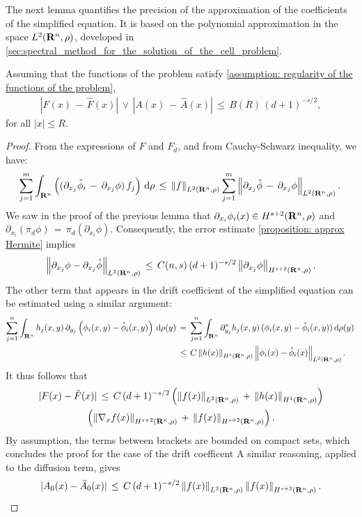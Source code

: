 The next lemma quantifies the precision of the approximation of the coefficients of the simplified equation. It is based on the polynomial approximation in the space $L^{2}(\mathbf R^n,\rho)$, developed in \cref{sec:spectral_method_for_the_solution_of_the_cell_problem}. 
\begin{lemma}
Assuming that the functions of the problem satisfy \cref{assumption: regularity
    of the functions of the problem}, 
\begin{gather*}
    |F(x) \,-\, \hat F(x)| \, \vee \, |A(x) \,-\, \hat A(x)| \, \leq \,  B(R) \,(d+1)^{-s/2},
\end{gather*}
for all $|x| \leq R$.
\label{lemma: Approximation coefficients}
\begin{proof}
    From the expressions of $F$ and $F_d$, and from Cauchy-Schwarz inequality, we have:
    $$ \sum^{m}_{j=1} \int_{\mathbf R^n}  \left((\partial_{x_j}\hat \phi_i \,-\, \partial_{x_j}\phi)\, f_j\right) \,\mathrm d \rho \,\leq\, \left\| f \right\|_{L^{2}(\mathbf R^n, \rho) }\sum^{m}_{j=1}  \left\| \partial_{x_j}\hat \phi \,-\, \partial_{x_j}\phi \right\|_{L^{2}(\mathbf R^n, \rho)}. \, $$
    We saw in the proof of the previous lemma that $\partial_{x_i} \phi_i(x)
    \in H^{s+2}(\mathbf R^n, \rho)$ and $\partial_{x_i} (\pi_d \phi) \,=\,
    \pi_d (\partial_{x_i}\phi)$. Consequently, the error estimate
    \cref{proposition: approx Hermite} implies
    $$
        \left\| \partial_{x_j}\phi- \partial_{x_j}\hat \phi \right\|_{L^{2}(\mathbf R^n,\rho) } \,\leq\, C(n,s) \, (d+1)^{-s/2} \left\| \partial_{x_j}\phi \right\|_{H^{s+2}(\mathbf R^n, \rho)}.
    $$
    The other term that appears in the drift coefficient of the simplified
    equation can be estimated using a similar argument:
    \begin{align*}
        \sum^{n}_{j=1} \int_{\mathbf R^n} h_j(x,y) \, \partial_{y_j} \left(\phi_i(x,y)-\hat\phi_i(x,y)\right) \,\mathrm d \rho(y) \,&=\,\sum^{n}_{j=1} \int_{\mathbf R^n} \partial^*_{y_j} h_j(x,y) \, (\phi_i(x,y)-\hat \phi_i(x,y)) \,\mathrm d \rho(y) \,\\ &\leq\,C \left\| h(x) \right\|_{H^{1}(\mathbf R^n, \rho)} \left\| \phi_i(x) - \hat \phi_i(x) \right\|_{L^{2}(\mathbf R^n, \rho)}.
    \end{align*}
    It thus follows that
    \begin{multline*}
        |F(x) - \hat F(x)| \,\leq\, C \,(d+1)^{-s/2}\left(\left\| f(x) \right\|_{L^{2}(\mathbf R^n,\rho)} \,+\, \left\| h(x) \right\|_{H^{1}(\mathbf R^n, \rho)} \right) \\ \left(\left\| \nabla_x f(x) \right\|_{H^{s+2}(\mathbf R^n, \rho)} \,+\,\left\| f(x) \right\|_{H^{s+2}(\mathbf R^n, \rho)}\right).
    \end{multline*}
    By assumption, the terms between brackets are bounded on compact sets,
    which concludes the proof for the case of the drift coefficent A similar
    reasoning, applied to the diffusion term, gives
    $$
        |A_0(x) - \hat A_0(x)| \,\leq\, C \, (d+1)^{-s/2}\left\| f(x) \right\|_{L^{2}(\mathbf R^n,\rho)} \left\| f(x) \right\|_{H^{s+2}(\mathbf R^n, \rho)}.
    $$
    
\end{proof}
\end{lemma}
